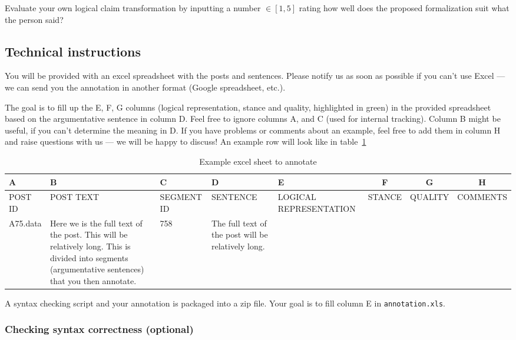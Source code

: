Evaluate your own logical claim transformation by inputting a number $\in [1, 5]$
rating how well does the proposed formalization suit what the person said?

\subsection*{Technical instructions}

You will be provided with an excel spreadsheet with the posts and sentences.
Please notify us as soon as possible if you can’t use Excel --- we can send you
the annotation in another format (Google spreadsheet, etc.). 

The goal is to fill up the E, F, G columns (logical representation, stance and
quality, highlighted in green) in the provided spreadsheet based on the
argumentative sentence in column D. Feel free to ignore columns A, and C (used
for internal tracking). Column B might be useful, if you can’t determine the
meaning in D. If you have problems or comments about an example, feel free to
add them in column H and raise questions with us --- we will be happy to
discuss! An example row will look like in table~\ref{tab:annotation_example}

\begin{table}[!htb]
\scriptsize
\begin{tabular}{|p{1.5cm} | p{2cm} | p{2cm} | p{2cm} | p{2cm} |c| c| c|}
\toprule
A & B & C & D & E & F & G & H \\
\midrule
POST ID & POST TEXT & SEGMENT ID & SENTENCE & LOGICAL REPRESENTATION
& STANCE & QUALITY & COMMENTS \\
\midrule
A75.data & 
Here we is the full text of the post. This will be relatively long.
This is divided into segments (argumentative sentences) that you then annotate. 
& 758 & 
The full text of the post will be relatively long.  
& \cellcolor{green!25} &  \cellcolor{green!25}& \cellcolor{green!25} & \cellcolor{green!25} \\
\bottomrule
\end{tabular}
\caption{Example excel sheet to annotate}
\label{tab:annotation_example}
\end{table}

A syntax checking script and your annotation is packaged into a zip file.  Your goal is to
fill column E in \texttt{annotation.xls}.

\subsubsection*{Checking syntax correctness (optional)}

